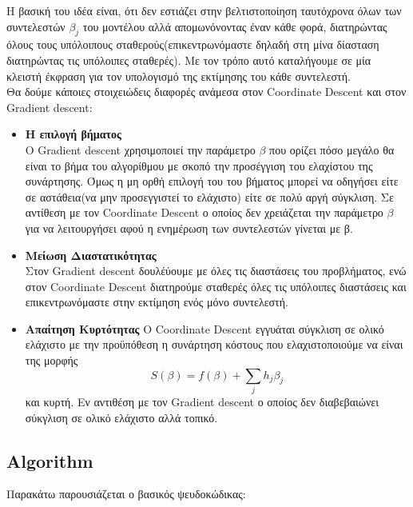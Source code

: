 \documentclass[12pt]{article}
\begin{document}
Η βασική του ιδέα  είναι, ότι δεν εστιάζει στην βελτιστοποίηση ταυτόχρονα όλων των συντελεστών $\beta_j$ του μοντέλου αλλά απομωνόνοντας έναν κάθε φορά, διατηρώντας όλους τους υπόλοιπους σταθερούς(επικεντρωνόμαστε δηλαδή στη μίνα δίασταση διατηρώντας τις υπόλοιπες σταθερές). Με τον τρόπο αυτό καταλήγουμε σε μία κλειστή έκφραση για τον υπολογισμό της εκτίμησης του κάθε συντελεστή.\\

Θα δούμε κάποιες στοιχειώδεις διαφορές ανάμεσα στον \textlatin{Coordinate Descent} και στον \textlatin{Gradient descent}:
\begin{itemize}
    \item \textbf{Η επιλογή βήματος}\\
    Ο \textlatin{Gradient descent} χρησιμοποιεί την παράμετρο $\beta$ που ορίζει πόσο μεγάλο θα είναι το βήμα του αλγορίθμου με σκοπό την προσέγγιση του ελαχίστου της συνάρτησης. Όμως η μη ορθή επιλογή του του βήματος μπορεί να οδηγήσει είτε σε αστάθεια(να μην προσεγγιστεί το ελάχιστο) είτε σε πολύ αργή σύγκλιση. Σε αντίθεση με τον \textlatin{Coordinate Descent} ο οποίος δεν χρειάζεται την παράμετρο $\beta$ για να λειτουργήσει αφού η ενημέρωση των συντελεστών γίνεται με β.
    \item \textbf{Μείωση Διαστατικότητας}\\
    Στον \textlatin{Gradient descent} δουλέύουμε με όλες τις διαστάσεις του προβλήματος, ενώ στον \textlatin{Coordinate Descent} διατηρούμε σταθερές όλες τις υπόλοιπες διαστάσεις και επικεντρωνόμαστε στην εκτίμηση ενός μόνο συντελεστή.
    \item\textbf{Απαίτηση Κυρτότητας}
    Ο \textlatin{Coordinate Descent} εγγυάται σύγκλιση σε ολικό ελάχιστο με την προϋπόθεση η συνάρτηση κόστους που ελαχιστοποιούμε να είναι της μορφής \[S(\beta) = f(\beta) + \sum_{j} h_j\beta_j\] και κυρτή. Εν αντιθέση με τον \textlatin{Gradient descent} ο οποίος δεν διαβεβαιώνει σύκγλιση σε ολικό ελάχιστο αλλά τοπικό. 
\end{itemize}


\newpage
\subsection{\textlatin{Algorithm}}
Παρακάτω παρουσιάζεται ο βασικός ψευδοκώδικας:

\end{document}
